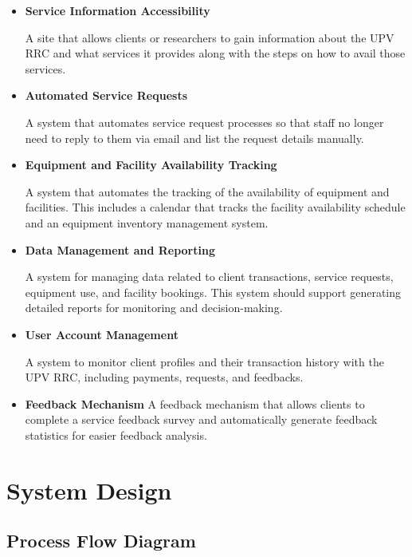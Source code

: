 \begin{itemize}
	\item \textbf{Service Information Accessibility}
	
	A site that allows clients or researchers to gain information about the UPV RRC and what services it provides along with the steps on how to avail those services. 
	
	\item \textbf{Automated Service Requests}
	
	A system that automates service request processes so that staff no longer need to reply to them via email and list the request details manually. 
	
	\item \textbf{Equipment and Facility Availability Tracking}
	
	A system that automates the tracking of the availability of equipment and facilities. This includes a calendar that tracks the facility availability schedule and an equipment inventory management system. 
	
	\item \textbf{Data Management and Reporting}
	
	A system for managing data related to client transactions, service requests, equipment use, and facility bookings. This system should support generating detailed reports for monitoring and decision-making.
	
	\item \textbf{User Account Management}
	
	A system to monitor client profiles and their transaction history with the UPV RRC, including payments, requests, and feedbacks.
	
	\item \textbf{Feedback Mechanism}
	A feedback mechanism that allows clients to complete a service feedback survey and automatically generate feedback statistics for easier feedback analysis.
	
\end{itemize}

\section{System Design}

\subsection{Process Flow Diagram}

